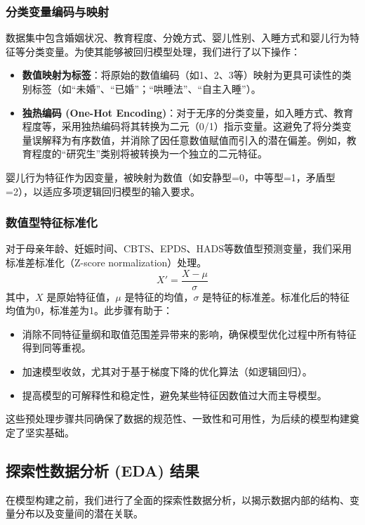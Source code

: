 \documentclass[withoutpreface,bwprint]{cumcmthesis}
\begin{document}
\subsubsection{分类变量编码与映射}
数据集中包含婚姻状况、教育程度、分娩方式、婴儿性别、入睡方式和婴儿行为特征等分类变量。为使其能够被回归模型处理，我们进行了以下操作：
\begin{itemize}
    \item \textbf{数值映射为标签}：将原始的数值编码（如1、2、3等）映射为更具可读性的类别标签（如“未婚”、“已婚”；“哄睡法”、“自主入睡”）。
    \item \textbf{独热编码 (One-Hot Encoding)}：对于无序的分类变量，如入睡方式、教育程度等，采用独热编码将其转换为二元（0/1）指示变量。这避免了将分类变量误解释为有序数值，并消除了因任意数值赋值而引入的潜在偏差。例如，教育程度的“研究生”类别将被转换为一个独立的二元特征。
\end{itemize}
婴儿行为特征作为因变量，被映射为数值（如安静型=0，中等型=1，矛盾型=2），以适应多项逻辑回归模型的输入要求。

\subsubsection{数值型特征标准化}
对于母亲年龄、妊娠时间、CBTS、EPDS、HADS等数值型预测变量，我们采用标准差标准化（Z-score normalization）处理。
$$ X' = \frac{X - \mu}{\sigma} $$
其中，$X$ 是原始特征值，$\mu$ 是特征的均值，$\sigma$ 是特征的标准差。标准化后的特征均值为0，标准差为1。此步骤有助于：
\begin{itemize}
    \item 消除不同特征量纲和取值范围差异带来的影响，确保模型优化过程中所有特征得到同等重视。
    \item 加速模型收敛，尤其对于基于梯度下降的优化算法（如逻辑回归）。
    \item 提高模型的可解释性和稳定性，避免某些特征因数值过大而主导模型。
\end{itemize}
这些预处理步骤共同确保了数据的规范性、一致性和可用性，为后续的模型构建奠定了坚实基础。

\subsection{探索性数据分析 (EDA) 结果}
在模型构建之前，我们进行了全面的探索性数据分析，以揭示数据内部的结构、变量分布以及变量间的潜在关联。
\end{document}
